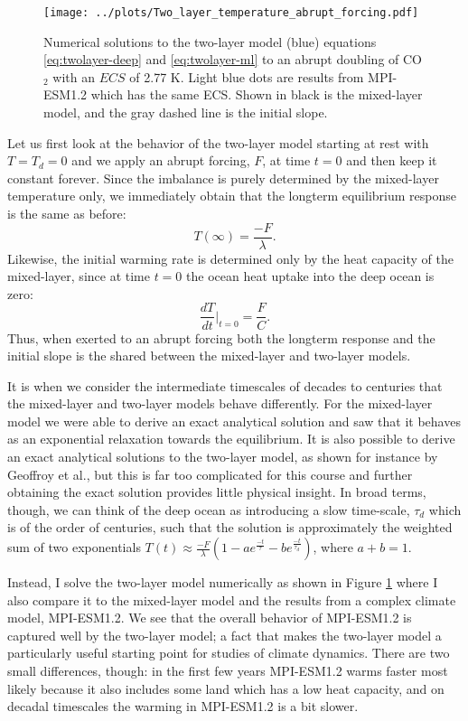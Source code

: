 \documentclass[12pt]{book}
\begin{document}
\begin{figure}
\begin{center}
\texttt{[image: ../plots/Two\_layer\_temperature\_abrupt\_forcing.pdf]}
\end{center}
\caption{ Numerical solutions to the two-layer model (blue) equations \ref{eq:twolayer-deep} and \ref{eq:twolayer-ml} to an abrupt doubling of CO$_2$ with an $ECS$ of 2.77 K. Light blue dots are results from MPI-ESM1.2 which has the same ECS. Shown in black is the mixed-layer model, and the gray dashed line is the initial slope. } 
\label{fig:two_layer_plot}
\end{figure}

Let us first look at the behavior of the two-layer model starting at rest with $T=T_d=0$ and we apply an abrupt forcing, $F$, at time $t=0$ and then keep it constant forever. Since the imbalance is purely determined by the mixed-layer temperature only, we immediately obtain that the longterm equilibrium response is the same as before:
$$ T(\infty)=\frac{-F}{\lambda}.$$
Likewise, the initial warming rate is determined only by the heat capacity of the mixed-layer, since at time $t=0$ the ocean heat uptake into the deep ocean is zero:
$$\frac{dT}{dt}\Bigr|_{t=0} = \frac{F}{C}.$$
Thus, when exerted to an abrupt forcing both the longterm response and the initial slope is the shared between the mixed-layer and two-layer models.

It is when we consider the intermediate timescales of decades to centuries that the mixed-layer and two-layer models behave differently. For the mixed-layer model we were able to derive an exact analytical solution and saw that it behaves as an exponential relaxation towards the equilibrium. It is also possible to derive an exact analytical solutions to the two-layer model, as shown for instance by Geoffroy et al.\cite{geoffroy2013a}, but this is far too complicated for this course and further obtaining the exact solution provides little physical insight. In broad terms, though, we can think of the deep ocean as introducing a slow time-scale, $\tau_d$ which is of the order of centuries, such that the solution is approximately the weighted sum of two exponentials $T(t) \approx \frac{-F}{\lambda}(1-a e^{\frac{-t}{\tau}}-b e^{\frac{-t}{\tau_d}})$, where $a+b=1$. 

Instead, I solve the two-layer model numerically as shown in Figure \ref{fig:two_layer_plot} where I also compare it to the mixed-layer model and the results from a complex climate model, MPI-ESM1.2. We see that the overall behavior of MPI-ESM1.2 is captured well by the two-layer model; a fact that makes the two-layer model a particularly useful starting point for studies of climate dynamics. There are two small differences, though: in the first few years MPI-ESM1.2 warms faster most likely because it also includes some land which has a low heat capacity, and on decadal timescales the warming in MPI-ESM1.2 is a bit slower. 
\end{document}
